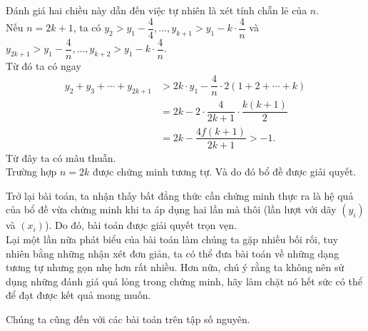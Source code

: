 \begin{vd}
{\begin{bode}
				Đánh giá hai chiều này dẫn đến việc tự nhiên là xét tính chẵn lẻ của $n$.\\
				Nếu $n=2k+1$, ta có $y_2>y_1-\dfrac{4}{4},\ldots, y_{k+1}>y_1-k\cdot\dfrac{4}{n}$ và $y_{2k+1}>y_1-\dfrac{4}{n},\ldots, y_{k+2}>y_1-k\cdot\dfrac{4}{n}.$\\
				Từ đó ta có ngay
				\begin{align*}
					y_2+y_3+\cdots+y_{2k+1}&>2k\cdot y_1-\dfrac{4}{n}\cdot 2(1+2+\cdots+k)\\
					&=2k-2\cdot\dfrac{4}{2k+1}\cdot\dfrac{k(k+1)}{2}\\
					&=2k-\dfrac{4f(k+1)}{2k+1}>-1.
				\end{align*}
				Từ đây ta có mâu thuẫn.\\
				Trường hợp $n=2k$ được chứng minh tương tự. Và do đó bổ đề được giải quyết.	 
		\end{bode}
		Trở lại bài toán, ta nhận thấy bất đẳng thức cần chứng minh thực ra là hệ quả của bổ đề vừa chứng minh khi ta áp dụng hai lần mà thôi (lần lượt với dãy $(y_i)$ và $(x_i)$). Do đó, bài toán được giải quyết trọn vẹn.\\
		 Lại một lần nữa phát biểu của bài toán làm chúng ta gặp nhiều bối rối, tuy nhiên bằng những nhận xét đơn giản, ta có thể đưa bài toán về những dạng tương tự nhưng gọn nhẹ hơn rất nhiều. Hơn nữa, chú ý rằng ta không nên sử dụng những đánh giá quá lỏng trong chứng minh, hãy làm chặt nó hết sức có thể để đạt được kết quả mong muốn.
	}
\end{vd}
Chúng ta cũng đến với các bài toán trên tập số nguyên.

